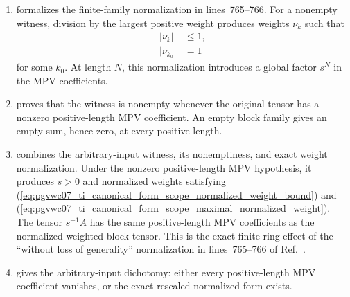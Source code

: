 \documentclass{article}
\begin{document}
\begin{enumerate}
    \item
          formalizes the finite-family normalization in lines~765--766. For a
          nonempty witness, division by the largest positive weight produces
          weights $\nu_k$ such that
          \begin{align}
              \lvert\nu_k\rvert
                  &\leq 1,
              \label{eq:pgvwc07_ti_canonical_form_scope_normalized_weight_bound}\\
              \lvert\nu_{k_0}\rvert
                  &= 1
              \label{eq:pgvwc07_ti_canonical_form_scope_maximal_normalized_weight}
          \end{align}
          for some $k_0$. At length $N$, this normalization introduces a
          global factor $s^N$ in the MPV coefficients.

    \item
          proves that the witness is nonempty whenever the original tensor has
          a nonzero positive-length MPV coefficient. An empty block family
          gives an empty sum, hence zero, at every positive length.

    \item
          combines the arbitrary-input witness, its nonemptiness, and exact
          weight normalization. Under the nonzero positive-length MPV
          hypothesis, it produces $s>0$ and normalized weights satisfying
          (\ref{eq:pgvwc07_ti_canonical_form_scope_normalized_weight_bound})
          and
          (\ref{eq:pgvwc07_ti_canonical_form_scope_maximal_normalized_weight}).
          The tensor $s^{-1}A$ has the same positive-length MPV coefficients
          as the normalized weighted block tensor. This is the exact
          finite-ring effect of the ``without loss of generality''
          normalization in lines~765--766 of
          Ref.~\cite{PerezGarcia2007MPSReps}.

    \item
          gives the arbitrary-input dichotomy: either every positive-length
          MPV coefficient vanishes, or the exact rescaled normalized form
          exists.


\end{enumerate}
\end{document}
